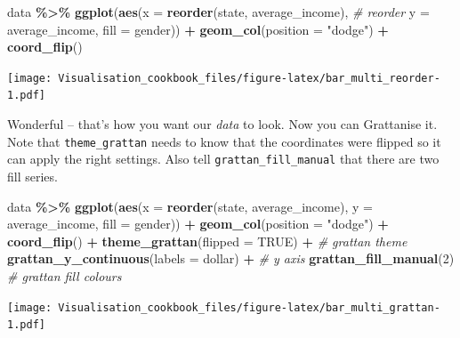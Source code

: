 \documentclass[
]{book}
\newenvironment{Shaded}{\begin{snugshade}}{\end{snugshade}}
\newcommand{\CommentTok}[1]{\textcolor[rgb]{0.56,0.35,0.01}{\textit{#1}}}
\newcommand{\DataTypeTok}[1]{\textcolor[rgb]{0.13,0.29,0.53}{#1}}
\newcommand{\DecValTok}[1]{\textcolor[rgb]{0.00,0.00,0.81}{#1}}
\newcommand{\KeywordTok}[1]{\textcolor[rgb]{0.13,0.29,0.53}{\textbf{#1}}}
\newcommand{\NormalTok}[1]{#1}
\newcommand{\OperatorTok}[1]{\textcolor[rgb]{0.81,0.36,0.00}{\textbf{#1}}}
\newcommand{\OtherTok}[1]{\textcolor[rgb]{0.56,0.35,0.01}{#1}}
\newcommand{\StringTok}[1]{\textcolor[rgb]{0.31,0.60,0.02}{#1}}
\begin{document}
\begin{Shaded}
\begin{Highlighting}[]
\NormalTok{data }\OperatorTok{\%\textgreater{}\%}\StringTok{ }
\StringTok{  }\KeywordTok{ggplot}\NormalTok{(}\KeywordTok{aes}\NormalTok{(}\DataTypeTok{x =} \KeywordTok{reorder}\NormalTok{(state, average\_income), }\CommentTok{\# reorder}
             \DataTypeTok{y =}\NormalTok{ average\_income,}
             \DataTypeTok{fill =}\NormalTok{ gender)) }\OperatorTok{+}\StringTok{ }
\StringTok{  }\KeywordTok{geom\_col}\NormalTok{(}\DataTypeTok{position =} \StringTok{"dodge"}\NormalTok{) }\OperatorTok{+}\StringTok{ }
\StringTok{  }\KeywordTok{coord\_flip}\NormalTok{()}
\end{Highlighting}
\end{Shaded}

\texttt{[image: Visualisation\_cookbook\_files/figure-latex/bar\_multi\_reorder-1.pdf]}

Wonderful -- that's how you want our \emph{data} to look. Now you can Grattanise it. Note that \texttt{theme\_grattan} needs to know that the coordinates were flipped so it can apply the right settings. Also tell \texttt{grattan\_fill\_manual} that there are two fill series.

\begin{Shaded}
\begin{Highlighting}[]
\NormalTok{data }\OperatorTok{\%\textgreater{}\%}\StringTok{ }
\StringTok{  }\KeywordTok{ggplot}\NormalTok{(}\KeywordTok{aes}\NormalTok{(}\DataTypeTok{x =} \KeywordTok{reorder}\NormalTok{(state, average\_income), }
             \DataTypeTok{y =}\NormalTok{ average\_income,}
             \DataTypeTok{fill =}\NormalTok{ gender)) }\OperatorTok{+}\StringTok{ }
\StringTok{  }\KeywordTok{geom\_col}\NormalTok{(}\DataTypeTok{position =} \StringTok{"dodge"}\NormalTok{) }\OperatorTok{+}\StringTok{ }
\StringTok{  }\KeywordTok{coord\_flip}\NormalTok{() }\OperatorTok{+}\StringTok{ }
\StringTok{  }\KeywordTok{theme\_grattan}\NormalTok{(}\DataTypeTok{flipped =} \OtherTok{TRUE}\NormalTok{) }\OperatorTok{+}\StringTok{ }\CommentTok{\# grattan theme}
\StringTok{  }\KeywordTok{grattan\_y\_continuous}\NormalTok{(}\DataTypeTok{labels =}\NormalTok{ dollar) }\OperatorTok{+}\StringTok{ }\CommentTok{\# y axis}
\StringTok{  }\KeywordTok{grattan\_fill\_manual}\NormalTok{(}\DecValTok{2}\NormalTok{) }\CommentTok{\# grattan fill colours}
\end{Highlighting}
\end{Shaded}

\texttt{[image: Visualisation\_cookbook\_files/figure-latex/bar\_multi\_grattan-1.pdf]}
\end{document}
